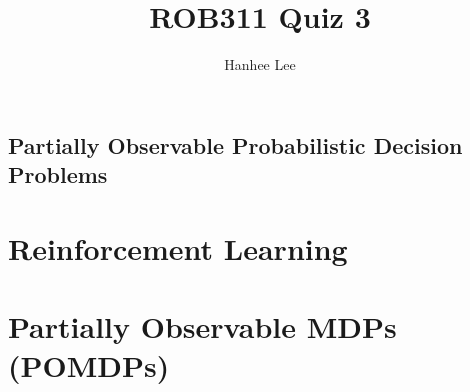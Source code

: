 \documentclass{article}
\title{ROB311 Quiz 3}
\author{Hanhee Lee}
\begin{document}
\maketitle

\tableofcontents
\newpage

\begin{center}
    \section*{Partially Observable Probabilistic Decision Problems}
\end{center}

\section{Reinforcement Learning}

\newpage

\section{Partially Observable MDPs (POMDPs)}

\newpage
\end{document}
